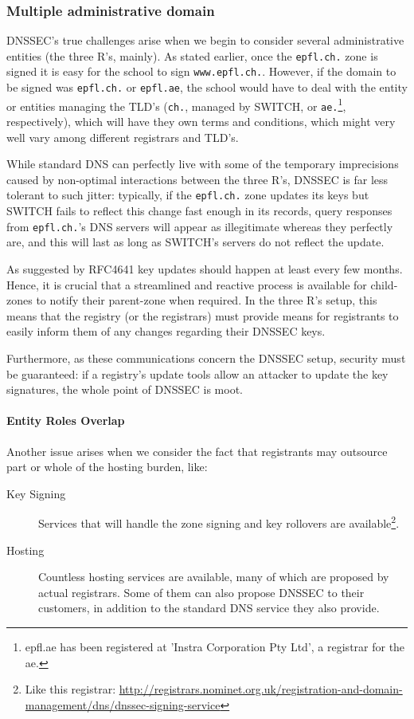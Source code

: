 \documentclass[a4paper,twocolumn]{scrartcl}
\begin{document}
\subsubsection{Multiple administrative domain}
DNSSEC's true challenges arise when we begin to consider several administrative entities (the three R's, mainly). As stated earlier, once the \verb|epfl.ch.| zone is signed it is easy for the school to sign \verb|www.epfl.ch.|. However, if the domain to be signed was \verb|epfl.ch.| or \verb|epfl.ae|, the school would have to deal with the entity or entities managing the TLD's (\verb|ch.|, managed by SWITCH, or \verb|ae.|\footnote{epfl.ae has been registered at 'Instra Corporation Pty Ltd', a registrar for the ae.}, respectively), which will have they own terms and conditions, which might very well vary among different registrars and TLD's. 	

While standard DNS can perfectly live with some of the temporary imprecisions caused by non-optimal interactions between the three R's, DNSSEC is far less tolerant to such jitter: typically, if the \verb|epfl.ch.| zone updates its keys but SWITCH fails to reflect this change fast enough in its records, query responses from \verb|epfl.ch.|'s DNS servers will appear as illegitimate whereas they perfectly are, and this will last as long as SWITCH's servers do not reflect the update.

As suggested by RFC4641 \cite{RFC4641} key updates should  happen at least every few months. Hence, it is crucial that a streamlined and reactive process is available for child-zones to notify their parent-zone when required. In the three R's setup, this means that the registry (or the registrars) must provide means for registrants to easily inform them of any changes regarding their DNSSEC keys.


Furthermore, as these communications concern the DNSSEC setup, security must be guaranteed: if a registry's update tools allow an attacker to update the key signatures, the whole point of DNSSEC is moot.

\paragraph*{Entity Roles Overlap} Another issue arises when we consider the fact that registrants may outsource part or whole of the hosting burden, like:

\begin{description}
\item[Key Signing] Services that will handle the zone signing and key rollovers are available\footnote{Like this registrar: \url{http://registrars.nominet.org.uk/registration-and-domain-management/dns/dnssec-signing-service}}.
\item[Hosting] Countless hosting services are available, many of which are proposed by actual registrars. Some of them can also propose DNSSEC to their customers, in addition to the standard DNS service they also provide.
\end{description}
\end{document}
